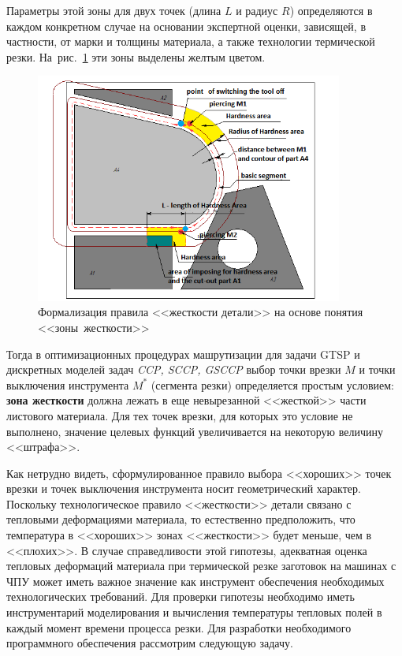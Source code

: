 \documentclass[11pt,twoside,openany]{report}
\begin{document}
Параметры этой зоны для двух точек
(длина $L$ и радиус $R$)
определяются в каждом конкретном случае
на основании экспертной оценки,
зависящей, в частности, от марки и толщины материала,
а также технологии термической резки.
На~рис.~\ref{hardness-area}
эти зоны выделены желтым цветом.

\begin{figure}[h]
 \begin{center}
  \includegraphics[width=0.9\textwidth]{hardness-area.png}
  \caption{
    Формализация правила <<жесткости детали>>
    на основе понятия
    <<зоны~жесткости>>
    }
  \label{hardness-area}
  \end{center}
\end{figure}

Тогда в оптимизационных процедурах машрутизации
для задачи GTSP  и дискретных моделей задач {\it CCP, SCCP, GSCCP}
выбор точки врезки $M$
и точки выключения инструмента $M^*$
(сегмента резки) определяется простым условием:
{\bf зона жесткости} должна лежать в еще невырезанной
<<жесткой>> части листового материала.
Для тех точек врезки, для которых это условие не выполнено,
значение целевых функций  увеличивается на некоторую величину
<<штрафа>>.

Как нетрудно видеть,
сформулированное правило выбора <<хороших>> точек врезки
и точек выключения инструмента носит геометрический характер.
Поскольку технологическое правило <<жесткости>> детали
связано с тепловыми деформациями материала,
то естественно предположить,
что температура в <<хороших>> зонах <<жесткости>> будет меньше,
чем в <<плохих>>.
В случае справедливости этой гипотезы,
адекватная оценка тепловых деформаций материала
при термической резке заготовок на машинах с ЧПУ
может иметь важное значение как инструмент
обеспечения необходимых технологических требований.
Для проверки гипотезы необходимо иметь инструментарий
моделирования и вычисления температуры тепловых полей в
каждый момент времени процесса резки.
Для разработки необходимого программного
обеспечения рассмотрим следующую задачу.
\end{document}
